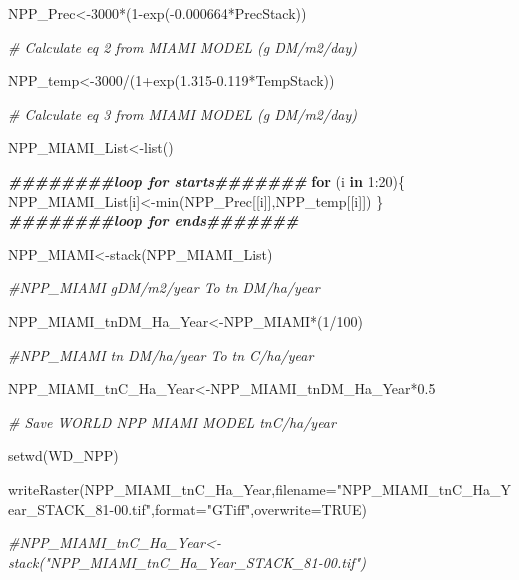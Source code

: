 \documentclass[
  10pt,
  b5paper,
]{book}
\newenvironment{Shaded}{\begin{snugshade}}{\end{snugshade}}
\newcommand{\AttributeTok}[1]{\textcolor[rgb]{0.77,0.63,0.00}{#1}}
\newcommand{\CommentTok}[1]{\textcolor[rgb]{0.56,0.35,0.01}{\textit{#1}}}
\newcommand{\ConstantTok}[1]{\textcolor[rgb]{0.00,0.00,0.00}{#1}}
\newcommand{\ControlFlowTok}[1]{\textcolor[rgb]{0.13,0.29,0.53}{\textbf{#1}}}
\newcommand{\DecValTok}[1]{\textcolor[rgb]{0.00,0.00,0.81}{#1}}
\newcommand{\DocumentationTok}[1]{\textcolor[rgb]{0.56,0.35,0.01}{\textbf{\textit{#1}}}}
\newcommand{\FloatTok}[1]{\textcolor[rgb]{0.00,0.00,0.81}{#1}}
\newcommand{\FunctionTok}[1]{\textcolor[rgb]{0.00,0.00,0.00}{#1}}
\newcommand{\NormalTok}[1]{#1}
\newcommand{\OtherTok}[1]{\textcolor[rgb]{0.56,0.35,0.01}{#1}}
\newcommand{\SpecialCharTok}[1]{\textcolor[rgb]{0.00,0.00,0.00}{#1}}
\newcommand{\StringTok}[1]{\textcolor[rgb]{0.31,0.60,0.02}{#1}}
\begin{document}
\begin{Shaded}
\begin{Highlighting}[]
\NormalTok{NPP\_Prec}\OtherTok{\textless{}{-}}\DecValTok{3000}\SpecialCharTok{*}\NormalTok{(}\DecValTok{1}\SpecialCharTok{{-}}\FunctionTok{exp}\NormalTok{(}\SpecialCharTok{{-}}\FloatTok{0.000664}\SpecialCharTok{*}\NormalTok{PrecStack))}

\CommentTok{\# Calculate eq 2 from MIAMI MODEL (g DM/m2/day)}

\NormalTok{NPP\_temp}\OtherTok{\textless{}{-}}\DecValTok{3000}\SpecialCharTok{/}\NormalTok{(}\DecValTok{1}\SpecialCharTok{+}\FunctionTok{exp}\NormalTok{(}\FloatTok{1.315{-}0.119}\SpecialCharTok{*}\NormalTok{TempStack))}

\CommentTok{\# Calculate eq 3 from MIAMI MODEL (g DM/m2/day)}

\NormalTok{NPP\_MIAMI\_List}\OtherTok{\textless{}{-}}\FunctionTok{list}\NormalTok{()}

\DocumentationTok{\#\#\#\#\#\#\#\#loop for starts\#\#\#\#\#\#\#}
\ControlFlowTok{for}\NormalTok{ (i }\ControlFlowTok{in} \DecValTok{1}\SpecialCharTok{:}\DecValTok{20}\NormalTok{)\{}
\NormalTok{NPP\_MIAMI\_List[i]}\OtherTok{\textless{}{-}}\FunctionTok{min}\NormalTok{(NPP\_Prec[[i]],NPP\_temp[[i]])}
\NormalTok{\}}
\DocumentationTok{\#\#\#\#\#\#\#\#loop for ends\#\#\#\#\#\#\#}

\NormalTok{NPP\_MIAMI}\OtherTok{\textless{}{-}}\FunctionTok{stack}\NormalTok{(NPP\_MIAMI\_List)}

\CommentTok{\#NPP\_MIAMI gDM/m2/year To tn DM/ha/year}

\NormalTok{NPP\_MIAMI\_tnDM\_Ha\_Year}\OtherTok{\textless{}{-}}\NormalTok{NPP\_MIAMI}\SpecialCharTok{*}\NormalTok{(}\DecValTok{1}\SpecialCharTok{/}\DecValTok{100}\NormalTok{)}

\CommentTok{\#NPP\_MIAMI tn DM/ha/year To tn C/ha/year}

\NormalTok{NPP\_MIAMI\_tnC\_Ha\_Year}\OtherTok{\textless{}{-}}\NormalTok{NPP\_MIAMI\_tnDM\_Ha\_Year}\SpecialCharTok{*}\FloatTok{0.5}

\CommentTok{\# Save WORLD NPP MIAMI MODEL tnC/ha/year}

\FunctionTok{setwd}\NormalTok{(WD\_NPP)}

\FunctionTok{writeRaster}\NormalTok{(NPP\_MIAMI\_tnC\_Ha\_Year,}\AttributeTok{filename=}\StringTok{"NPP\_MIAMI\_tnC\_Ha\_Year\_STACK\_81{-}00.tif"}\NormalTok{,}\AttributeTok{format=}\StringTok{"GTiff"}\NormalTok{,}\AttributeTok{overwrite=}\ConstantTok{TRUE}\NormalTok{)}

\CommentTok{\#NPP\_MIAMI\_tnC\_Ha\_Year\textless{}{-}stack("NPP\_MIAMI\_tnC\_Ha\_Year\_STACK\_81{-}00.tif")}


\end{Highlighting}
\end{Shaded}
\end{document}
